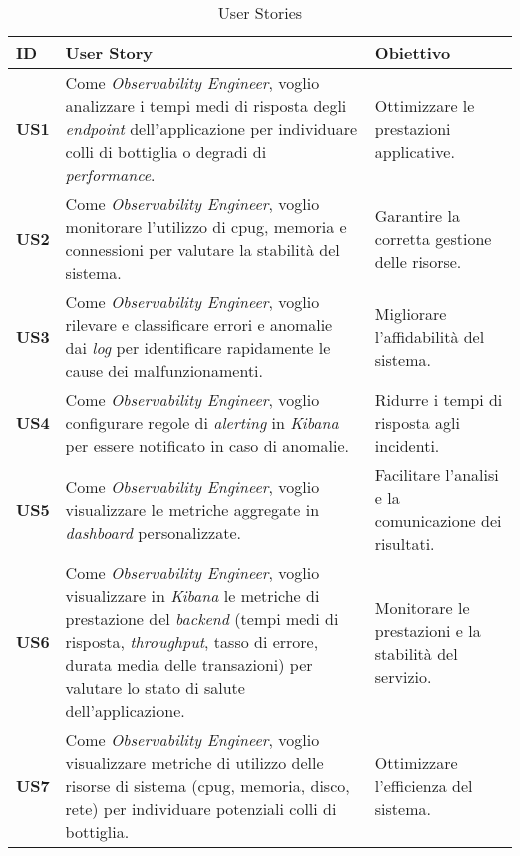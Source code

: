 \centering
\begin{longtable}{|p{1cm}|p{8cm}|p{3cm}|}
\caption{User Stories}
\label{tab:user-stories} \\
\hline
\rowcolor[gray]{0.8}
\textbf{ID} & \textbf{User Story} & \textbf{Obiettivo} \\
\hline
\endfirsthead

\hline
\textbf{US1} & Come \emph{Observability Engineer}, voglio analizzare i tempi medi di risposta degli \emph{endpoint} dell'applicazione per individuare colli di bottiglia o degradi di \emph{performance}. & Ottimizzare le prestazioni applicative. \\
\hline

\textbf{US2} & Come \emph{Observability Engineer}, voglio monitorare l'utilizzo di \gls{cpug}, memoria e connessioni per valutare la stabilità del sistema. & Garantire la corretta gestione delle risorse. \\
\hline

\textbf{US3} & Come \emph{Observability Engineer}, voglio rilevare e classificare errori e anomalie dai \emph{log} per identificare rapidamente le cause dei malfunzionamenti. & Migliorare l'affidabilità del sistema. \\
\hline

\textbf{US4} & Come \emph{Observability Engineer}, voglio configurare regole di \emph{alerting} in \emph{Kibana} per essere notificato in caso di anomalie. & Ridurre i tempi di risposta agli incidenti. \\
\hline

\textbf{US5} & Come \emph{Observability Engineer}, voglio visualizzare le metriche aggregate in \emph{dashboard} personalizzate. & Facilitare l'analisi e la comunicazione dei risultati. \\
\hline

\textbf{US6} & Come \emph{Observability Engineer}, voglio visualizzare in \emph{Kibana} le metriche di prestazione del \emph{backend} (tempi medi di risposta, \emph{throughput}, tasso di errore, durata media delle transazioni) per valutare lo stato di salute dell'applicazione. & Monitorare le prestazioni e la stabilità del servizio. \\
\hline

\textbf{US7} & Come \emph{Observability Engineer}, voglio visualizzare metriche di utilizzo delle risorse di sistema (\gls{cpug}, memoria, disco, rete) per individuare potenziali colli di bottiglia. & Ottimizzare l'efficienza del sistema. \\
\hline


\end{longtable}
